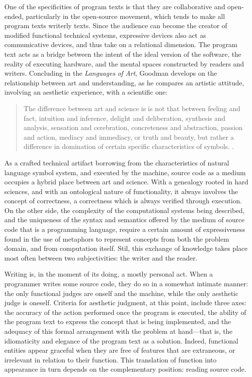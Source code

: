 One of the specificities of program texts is that they are collaborative and open-ended, particularly in the open-source movement, which tends to make all program texts writerly texts. Since the audience can become the creator of modified functional technical systems, expressive devices also act as communicative devices, and thus take on a relational dimension. The program text acts as a bridge between the intent of the ideal version of the software, the reality of executing hardware, and the mental spaces constructed by readers and writers. Concluding in the \emph{Languages of Art}, Goodman develops on the relationship between art and understanding, as he compares an artistic attitude, involving an aesthetic experience, with a scientific one:

\begin{quote}
  The difference between art and science is is not that between feeling and fact, intuition and inference, delight and deliberation, synthesis and analysis, sensation and cerebration, concreteness and abstraction, passion and action, mediacy and immediacy, or truth and beauty, but rather a difference in domination of certain specific characteristics of symbols. \citep{goodman_languages_1976}.
\end{quote}

As a crafted technical artifact borrowing from the characteristics of natural language symbol system, and executed by the machine, source code as a medium occupies a hybrid place between art and science. With a genealogy rooted in hard sciences, and with an ontological nature of functionality, it always involves the concept of correctness, a correctness which is always verified through execution. On the other side, the complexity of the computational systems being described, and the uniqueness of the syntax and semantics offered by the medium of source code that is a programming language, require a certain amount of expressiveness found in the use of metaphors to represent concepts from both the problem domain, and from computation itself. Stil, this exchange of knowledge takes place most often between two subjectivities: the writer and the reader.

Writing is, in the moment of its doing, a mostly personal act. When a programmer writes some source code, they do so in a somewhat intimate manner: the only functional judges are onself and the machine, while the only aesthetic judge is oneself. Criteria for aesthetic judgment, at this point, include three axes: the accuracy of the action performed once the program is executed, the ability of the program text to express the concept that is being implemented, and the adequacy of this formal arrangement with the problem at hand—that is, the idiomaticity and elegance of the program text as a solution. Indeed, functional entities appear graceful when they are free of features that are extraneous, or irrelevant in relation to their function. This translation of function into appearance in turn depends on the complementary position: reading source code.

